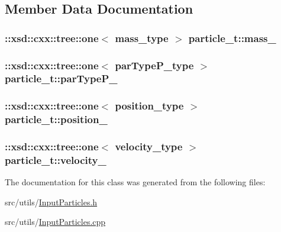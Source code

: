 \subsection{Member Data Documentation}
\hypertarget{classparticle__t_a5c33cbf5a5ac4b4d6ef74cfc19366f77}{
\subsubsection[{mass\-\_\-}]{\setlength{\rightskip}{0pt plus 5cm}\-::xsd\-::cxx\-::tree\-::one$<$ {\bf mass\-\_\-type} $>$ particle\-\_\-t\-::mass\-\_\-\hspace{0.3cm}{\ttfamily [protected]}}}\label{classparticle__t_a5c33cbf5a5ac4b4d6ef74cfc19366f77}
\hypertarget{classparticle__t_a766d1a1cbb2d1deb3895f4c86ee5b6d2}{
\subsubsection[{par\-Type\-P\-\_\-}]{\setlength{\rightskip}{0pt plus 5cm}\-::xsd\-::cxx\-::tree\-::one$<$ {\bf par\-Type\-P\-\_\-type} $>$ particle\-\_\-t\-::par\-Type\-P\-\_\-\hspace{0.3cm}{\ttfamily [protected]}}}\label{classparticle__t_a766d1a1cbb2d1deb3895f4c86ee5b6d2}
\hypertarget{classparticle__t_a9617dc13afdc37ecd76d16f2abf14b60}{
\subsubsection[{position\-\_\-}]{\setlength{\rightskip}{0pt plus 5cm}\-::xsd\-::cxx\-::tree\-::one$<$ {\bf position\-\_\-type} $>$ particle\-\_\-t\-::position\-\_\-\hspace{0.3cm}{\ttfamily [protected]}}}\label{classparticle__t_a9617dc13afdc37ecd76d16f2abf14b60}
\hypertarget{classparticle__t_a4e8569ca9f6438eca58864d57ce73b39}{
\subsubsection[{velocity\-\_\-}]{\setlength{\rightskip}{0pt plus 5cm}\-::xsd\-::cxx\-::tree\-::one$<$ {\bf velocity\-\_\-type} $>$ particle\-\_\-t\-::velocity\-\_\-\hspace{0.3cm}{\ttfamily [protected]}}}\label{classparticle__t_a4e8569ca9f6438eca58864d57ce73b39}


The documentation for this class was generated from the following files\-:\begin{DoxyCompactItemize}
\item 
src/utils/\hyperlink{InputParticles_8h}{Input\-Particles.\-h}\item 
src/utils/\hyperlink{InputParticles_8cpp}{Input\-Particles.\-cpp}\end{DoxyCompactItemize}
